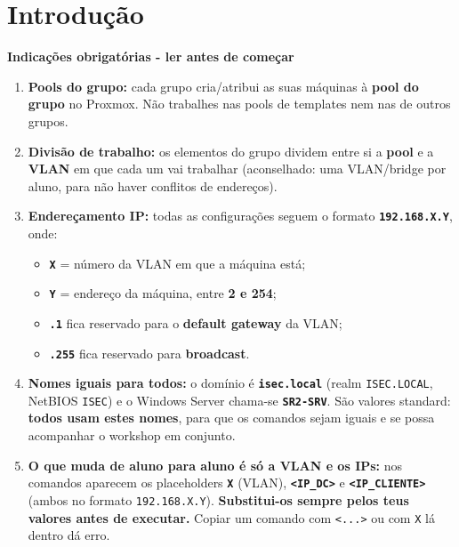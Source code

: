 
\chapter*{Introdução}

\begin{avisobox}[title={Atenção}]
\textbf{Indicações obrigatórias - ler antes de começar}

\begin{enumerate}
\item \textbf{Pools do grupo:} cada grupo cria/atribui as suas máquinas à \textbf{pool do grupo} no Proxmox. Não trabalhes nas pools de templates nem nas de outros grupos.
\item \textbf{Divisão de trabalho:} os elementos do grupo dividem entre si a \textbf{pool} e a \textbf{VLAN} em que cada um vai trabalhar (aconselhado: uma VLAN/bridge por aluno, para não haver conflitos de endereços).
\item \textbf{Endereçamento IP:} todas as configurações seguem o formato \textbf{\texttt{192.168.X.Y}}, onde:
\begin{itemize}
\item \textbf{\texttt{X}} = número da VLAN em que a máquina está;
\item \textbf{\texttt{Y}} = endereço da máquina, entre \textbf{2 e 254};
\item \textbf{\texttt{.1}} fica reservado para o \textbf{default gateway} da VLAN;
\item \textbf{\texttt{.255}} fica reservado para \textbf{broadcast}.
\end{itemize}
\item \textbf{Nomes iguais para todos:} o domínio é \textbf{\texttt{isec.local}} (realm \texttt{ISEC.LOCAL}, NetBIOS \texttt{ISEC}) e o Windows Server chama-se \textbf{\texttt{SR2-SRV}}. São valores standard: \textbf{todos usam estes nomes}, para que os comandos sejam iguais e se possa acompanhar o workshop em conjunto.
\item \textbf{O que muda de aluno para aluno é só a VLAN e os IPs:} nos comandos aparecem os placeholders \textbf{\texttt{X}} (VLAN), \textbf{\texttt{\textless{}IP\_DC\textgreater{}}} e \textbf{\texttt{\textless{}IP\_CLIENTE\textgreater{}}} (ambos no formato \texttt{192.168.X.Y}). \textbf{Substitui-os sempre pelos teus valores antes de executar.} Copiar um comando com \texttt{\textless{}...\textgreater{}} ou com \texttt{X} lá dentro dá erro.
\end{enumerate}
\end{avisobox}

